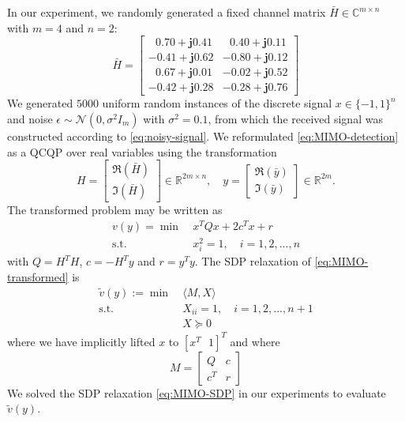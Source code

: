 \documentclass[10pt]{article} %
\theoremstyle{plain}
\theoremstyle{definition}
\theoremstyle{remark}
\begin{document}
In our experiment, we randomly generated a fixed channel matrix $\bar{H} \in \mathbb{C}^{m \times n}$ with $m = 4$ and $n = 2$:
\[
\bar{H} =\begin{bmatrix}
~~~0.70 + \textbf{j}0.41 & ~~~0.40 + \textbf{j}0.11 \\
-0.41 + \textbf{j}0.62 &-0.80 + \textbf{j}0.12 \\
~~~0.67 + \textbf{j}0.01 & -0.02+ \textbf{j}0.52 \\
-0.42 + \textbf{j}0.28 & -0.28 + \textbf{j}0.76
\end{bmatrix}
\]
We generated $5000$ uniform random instances of the discrete signal $x \in \{-1, 1\}^n$ and noise $\epsilon \sim \mathcal{N}(0, \sigma^2 I_m)$ with $\sigma^2 = 0.1$, from which the received signal was constructed according to \eqref{eq:noisy-signal}. We reformulated \eqref{eq:MIMO-detection} as a QCQP over real variables using the transformation
\[
H = \begin{bmatrix} \Re(\bar{H}) \\ \Im(\bar{H}) \end{bmatrix} \in \mathbb{R}^{2m \times n}, \quad
y = \begin{bmatrix} \Re(\bar{y}) \\ \Im(\bar{y}) \end{bmatrix} \in \mathbb{R}^{2m}.
\]
The transformed problem may be written as
\begin{align}
    v(y) = \min~& x^T Q x + 2c^T x + r \label{eq:MIMO-transformed} \\
    \text{s.t.}~& x_i^2 = 1, \quad i = 1, 2, ..., n \nonumber
\end{align}
with $Q = H^T H$, $c = -H^T y$ and $r = y^Ty$. The SDP relaxation of \eqref{eq:MIMO-transformed} is
\begin{align}
    \tilde{v}(y) := \min~& \langle M, X \rangle \label{eq:MIMO-SDP} \\
    \text{s.t.}~& X_{ii} = 1, \quad i = 1, 2, ..., n+1 \nonumber \\
    & X \succeq 0 \nonumber
\end{align}
where we have implicitly lifted $x$ to $[x^T ~~~ 1]^T$ and where
\[
M = \begin{bmatrix}
    Q & c \\
    c^T & r
\end{bmatrix}
\]
We solved the SDP relaxation \eqref{eq:MIMO-SDP} in our experiments to evaluate $\tilde{v}(y)$.
\end{document}
